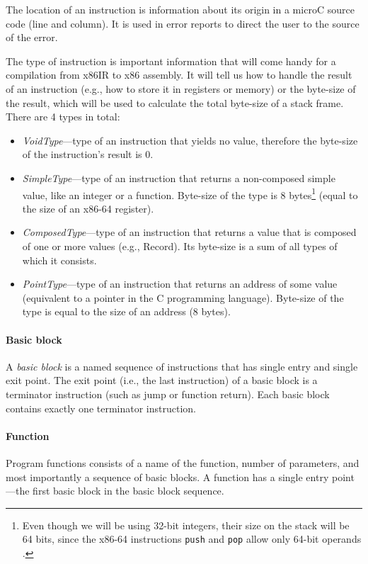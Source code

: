\documentclass[thesis=M,english]{FITthesis}[2019/12/23]
\begin{document}
The location of an instruction is information about its origin in a microC source code (line and column). It is used in error reports to direct the user to the source of the error.

The type of instruction is important information that will come handy for a compilation from x86IR to x86 assembly. It will tell us how to handle the result of an instruction (e.g., how to store it in registers or memory) or the byte-size of the result, which will be used to calculate the total byte-size of a stack frame. There are 4 types in total:
\begin{itemize}
    \item \emph{VoidType}---type of an instruction that yields no value, therefore the byte-size of the instruction's result is 0.
    \item \emph{SimpleType}---type of an instruction that returns a non-composed simple value, like an integer or a function. Byte-size of the type is 8 bytes\footnote{Even though we will be using 32-bit integers, their size on the stack will be 64 bits, since the x86-64 instructions \texttt{push} and \texttt{pop} allow only 64-bit operands \cite[Chap. 9.2]{x86_assembly}\cite{so_push}.} (equal to the size of an x86-64 register).
    \item \emph{ComposedType}---type of an instruction that returns a value that is composed of one or more values (e.g., Record). Its byte-size is a sum of all types of which it consists.
    \item \emph{PointType}---type of an instruction that returns an address of some value (equivalent to a pointer in the C programming language). Byte-size of the type is equal to the size of an address (8 bytes).
\end{itemize}

\paragraph*{Basic block} A \emph{basic block} is a named sequence of instructions that has single entry and single exit point. The exit point (i.e., the last instruction) of a basic block is a terminator instruction (such as jump or function return). Each basic block contains exactly one terminator instruction.

\paragraph*{Function} Program functions consists of a name of the function, number of parameters, and most importantly a sequence of basic blocks. A function has a single entry point---the first basic block in the basic block sequence.
\end{document}
